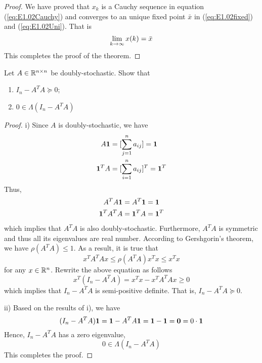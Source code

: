 \documentclass[a4 paper, 12pt]{article}
\begin{document}
\begin{proof}
We have proved that $x_k$ is a Cauchy sequence in equation (\ref{eq:E1.02Cauchy}) and converges to an unique fixed point $\bar x$ in (\ref{eq:E1.02fixed}) and (\ref{eq:E1.02Uni}). That is
\begin{equation}
        \lim_{k\rightarrow\infty} x(k) = \bar x
\end{equation}
This completes the proof of the theorem.
\end{proof}


 Let $A \in \mathbb{R}^{n\times n}$ be doubly-stochastic. Show that
\begin{enumerate}[label = {\roman{enumi})}]
        \item $I_n - A^TA \succeq 0$;
        \item $0 \in \Lambda(I_n - A^TA)$
\end{enumerate}

\begin{proof}

i) Since $A$ is doubly-stochastic, we have
\begin{align}
        A\textbf{1} &= [\sum_{j = 1}^n a_{ij}] = \textbf{1} \\
        \textbf{1}^TA &= [\sum_{i = 1}^n a_{ij}]^T = \textbf{1}^T
\end{align}
Thus,
\begin{align}
        A^TA\textbf{1} &= A^T\textbf{1} = \textbf{1} \\
        \textbf{1}^TA^TA &= \textbf{1}^TA = \textbf{1}^T
\end{align}
which implies that $A^TA$ is also doubly-stochastic. Furthermore, $A^TA$ is symmetric and thus all its eigenvalues are real number. According to Gershgorin's theorem, we have $\rho(A^TA) \leq 1$. As a result, it is true that
\begin{equation}
        x^TA^TAx \leq \rho(A^TA)x^Tx \leq x^Tx
\end{equation}
for any $x \in \mathbb{R}^n$. Rewrite the above equation as follows
\begin{equation}
        x^T(I_n - A^TA) = x^Tx - x^TA^TAx \geq 0
\end{equation}
which implies that $I_n - A^TA$ is semi-positive definite. That is, $I_n - A^TA \succeq 0$.

ii) Based on the results of i), we have
\begin{equation}
        (I_n - A^TA)\textbf{1} = \textbf{1} - A^TA\textbf{1} = \textbf{1} - \textbf{1} = \textbf{0} = 0\cdot\textbf{1}
\end{equation}
Hence, $I_n - A^TA$ has a zero eigenvalue,
\begin{equation}
        0 \in \Lambda(I_n - A^TA)
\end{equation}
This completes the proof.

\end{proof}
\end{document}
